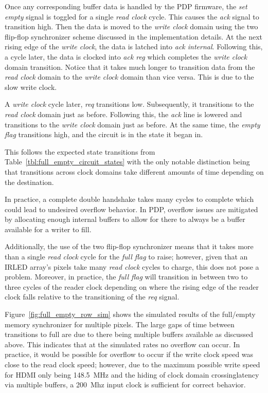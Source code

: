 Once any corresponding buffer data is handled by the PDP firmware, the {\it set empty} signal is toggled for a single {\it read clock} cycle. This causes the {\it ack} signal to transition high. Then the data is moved to the {\it write clock} domain using the two flip-flop synchronizer scheme discussed in the implementation details. At the next rising edge of the {\it write clock}, the data is latched into {\it ack internal}. Following this, a cycle later, the data is clocked into {\it ack reg} which completes the {\it write clock} domain transition. Notice that it takes much longer to transition data from the {\it read clock} domain to the {\it write clock} domain than vice versa. This is due to the slow write clock.

A {\it write clock} cycle later, {\it req} transitions low. Subsequently, it transitions to the {\it read clock} domain just as before. Following this, the {\it ack} line is lowered and transitions to the {\it write clock} domain just as before. At the same time, the {\it empty flag} transitions high, and the circuit is in the state it began in.

This follows the expected state transitions from Table~\ref{tbl:full_empty_circuit_states} with the only notable distinction being that transitions across clock domains take different amounts of time depending on the destination.

In practice, a complete double handshake takes many cycles to complete which could lead to undesired overflow behavior. In PDP, overflow issues are mitigated by allocating enough internal buffers to allow for there to always be a buffer available for a writer to fill.

Additionally, the use of the two flip-flop synchronizer means that it takes more than a single {\it read clock} cycle for the {\it full flag} to raise; however, given that an IRLED array's pixels take many {\it read clock} cycles to charge, this does not pose a problem. Moreover, in practice, the {\it full flag} will transition in between two to three cycles of the reader clock depending on where the rising edge of the reader clock falls relative to the transitioning of the {\it req} signal.

Figure~\ref{fig:full_empty_row_sim} shows the simulated results of the full/empty memory synchronizer for multiple pixels. The large gaps of time between transitions to full are due to there being multiple buffers available as discussed above. This indicates that at the simulated rates no overflow can occur. In practice, it would be possible for overflow to occur if the write clock speed was close to the read clock speed; however, due to the maximum possible write speed for HDMI only being \mbox{148.5 MHz} and the hiding of clock domain crossinglatency via multiple buffers, a \mbox{200 Mhz} input clock is sufficient for correct behavior.

